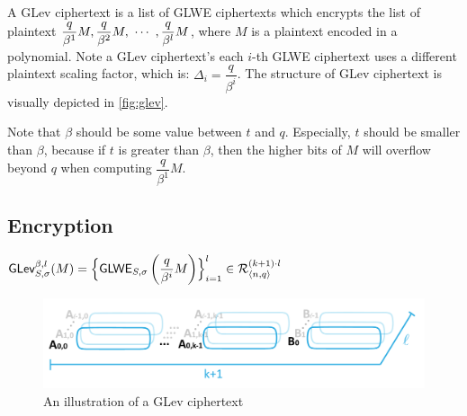 A GLev ciphertext is a list of GLWE ciphertexts which encrypts the list of plaintext $\dfrac{q}{\beta^1}M, \dfrac{q}{\beta^2}M, \text{ } \text{$\cdots$} \text{ }, \dfrac{q}{\beta^l}M$, where $M$ is a plaintext encoded in a polynomial. Note  a GLev ciphertext's each $i$-th GLWE ciphertext uses a different plaintext scaling factor, which is: $\Delta_i = \dfrac{q}{\beta^i}$. The structure of GLev ciphertext is visually depicted in \autoref{fig:glev}.

Note that $\beta$ should be some value between $t$ and $q$. Especially, $t$ should be smaller than $\beta$, because if $t$ is greater than $\beta$, then the higher bits of $M$ will overflow beyond $q$ when computing $\dfrac{q}{\beta^1}M$. 


\subsection{Encryption}
\label{subsec:glev-enc}

\begin{tcolorbox}[title={\textbf{\tboxlabel{\ref*{subsec:glev-enc}} GLev Encryption}}]


$\textsf{GLev}_{S, \sigma}^{\beta, l}(M) = \Bigl \{\textsf{GLWE}_{S, \sigma}\left(\dfrac{q}{\beta^i} M\right)  \Bigr \}_{i=1}^{l} \in \mathcal{R}_{\langle n, q \rangle }^{(k+1) \cdot l}$
\end{tcolorbox}

\begin{figure}[h!]
    \centering
  \includegraphics[width=1.0\linewidth]{figures/TFHE-fig2.pdf}
  \caption{An illustration of a GLev ciphertext }
  \label{fig:glev}
\end{figure}


